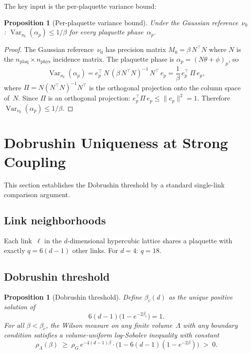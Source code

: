 \documentclass[11pt,a4paper]{article}
\theoremstyle{plain}
\newtheorem{proposition}[theorem]{Proposition}
\theoremstyle{definition}
\theoremstyle{remark}
\newcommand{\Var}{\operatorname{Var}}
\begin{document}
The key input is the per-plaquette variance bound:

\begin{proposition}[Per-plaquette variance bound]
\label{prop:plaquette}
Under the Gaussian reference~$\nu_0$:
$\Var_{\nu_0}(\alpha_p) \leq 1/\beta$
for every plaquette phase~$\alpha_p$.
\end{proposition}

\begin{proof}
The Gaussian reference~$\nu_0$ has precision matrix
$M_0 = \beta\,N^\top N$ where $N$ is the
$n_{\mathrm{plaq}} \times n_{\mathrm{phys}}$ incidence
matrix.
The plaquette phase is
$\alpha_p = (N\theta + \phi)_p$, so
\begin{equation}
  \Var_{\nu_0}(\alpha_p)
  = e_p^\top\,N\,(\beta\,N^\top N)^{-1}\,N^\top\,e_p
  = \frac{1}{\beta}\,e_p^\top\,\Pi\,e_p,
\end{equation}
where $\Pi = N(N^\top N)^{-1}N^\top$ is the
orthogonal projection onto the column space of~$N$.
Since $\Pi$ is an orthogonal projection:
$e_p^\top\Pi\,e_p \leq \|e_p\|^2 = 1$.
Therefore $\Var_{\nu_0}(\alpha_p) \leq 1/\beta$.
\end{proof}


\section{Dobrushin Uniqueness at Strong Coupling}
\label{sec:dobrushin}

This section establishes the Dobrushin threshold by a
standard single-link comparison argument.

\subsection{Link neighborhoods}

Each link~$\ell$ in the $d$-dimensional hypercubic lattice
shares a plaquette with exactly $q = 6(d{-}1)$ other links.
For $d = 4$: $q = 18$.

\subsection{Dobrushin threshold}

\begin{proposition}[Dobrushin threshold]
\label{prop:dobrushin}
Define $\beta_c(d)$ as the unique positive solution of
\begin{equation}\label{eq:threshold}
  6(d{-}1)\bigl(1 - e^{-2\beta_c}\bigr) = 1.
\end{equation}
For all $\beta < \beta_c$, the Wilson measure on any finite
volume~$\Lambda$ with any boundary condition satisfies
a volume-uniform log-Sobolev inequality with constant
\begin{equation}
  \rho_\Lambda(\beta) \;\geq\;
  \rho_G\,e^{-4(d-1)\beta}
  \cdot\bigl(1 - 6(d{-}1)(1 - e^{-2\beta})\bigr)
  \;>\; 0.
\end{equation}
\end{proposition}
\end{document}
